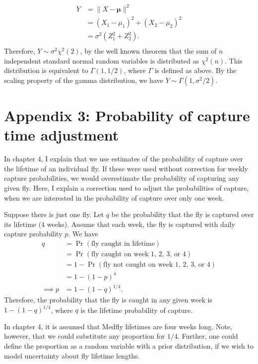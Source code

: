 \documentclass[
  oneside]{book}
\begin{document}
\[
\begin{aligned}
  Y &= \lVert X - \pmb \mu \rVert^2  \\
    &= (X_1 - \mu_1)^2 + (X_2 - \mu_2)^2 \\
    &= \sigma^2 (Z_1^2 + Z_2^2). \\
\end{aligned}
\]
Therefore, \(Y \sim \sigma^2 \chi^2(2)\), by the well known theorem that the sum of \(n\) independent standard normal random variables is distributed as \(\chi^2(n)\). This distribution is equivalent to \(\Gamma(1, 1/2)\), where \(\Gamma\) is defined as above. By the scaling property of the gamma distribution, we have \(Y \sim \Gamma(1, \sigma^2 / 2)\).

\hypertarget{appendix-3-probability-of-capture-time-adjustment}{%
\section{Appendix 3: Probability of capture time adjustment}\label{appendix-3-probability-of-capture-time-adjustment}}

In chapter 4, I explain that we use estimates of the probability of capture over the lifetime of an individual fly. If these were used without correction for weekly capture probabilities, we would overestimate the probability of capturing any given fly. Here, I explain a correction used to adjust the probabilities of capture, when we are interested in the probability of capture over only one week.

Suppose there is just one fly. Let \(q\) be the probability that the fly is captured over its lifetime (4 weeks). Assume that each week, the fly is captured with daily capture probability \(p\). We have
\[
\begin{aligned}
  q &= \Pr(\text{fly caught in lifetime}) \\
    &= \Pr(\text{fly caught on week 1, 2, 3, or 4}) \\
    &= 1 - \Pr(\text{fly not caught on week 1, 2, 3, or 4}) \\
    &= 1 - (1 - p)^{4} \\
    \implies p &= 1 - (1-q)^{1/4}.
\end{aligned}
\]
Therefore, the probability that the fly is caught in any given week is \(1 - (1 - q)^{1/4}\), where \(q\) is the lifetime probability of capture.

In chapter 4, it is assumed that Medfly lifetimes are four weeks long. Note, however, that we could substitute any proportion for \(1/4\). Further, one could define the proportion as a random variable with a prior distribution, if we wish to model uncertainty about fly lifetime lengths.

\renewcommand{\baselinestretch}{1}\normalsize

  
\end{document}
